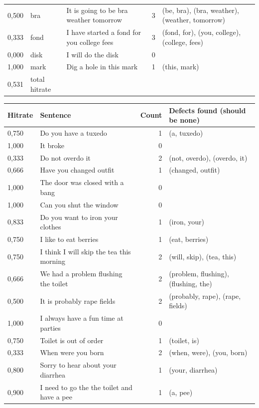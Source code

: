 \documentclass[a4paper,12pt]{article}
\begin{document}
\begin{landscape}
\begin{longtable}{l l l r l}
0,500 & bra & It is going to be bra weather tomorrow & 3 & (be, bra), (bra, weather), (weather, tomorrow) \\
0,333 & fond & I have started a fond for you college fees & 3 & (fond, for), (you, college), (college, fees) \\
0,000 & disk & I will do the disk & 0 &  \\
1,000 & mark & Dig a hole in this mark & 1 & (this, mark) \\
\hline
0,531 & total hitrate
\label{tab:resultincorrect}
\end{longtable}
\end{landscape}

\begin{landscape}
\centering
\begin{longtable}{l l r l}
Hitrate & Sentence & Count & Defects found (should be none) \\
\hline
0,750 & Do you have a tuxedo & 1 & (a, tuxedo) \\
1,000 & It broke & 0 &  \\
0,333 & Do not overdo it & 2 & (not, overdo), (overdo, it) \\
0,666 & Have you changed outfit & 1 & (changed, outfit) \\
1,000 & The door was closed with a bang & 0 &  \\
1,000 & Can you shut the window & 0 &  \\
0,833 & Do you want to iron your clothes & 1 & (iron, your) \\
0,750 & I like to eat berries & 1 & (eat, berries) \\
0,750 & I think I will skip the tea this morning & 2 & (will, skip), (tea, this) \\
0,666 & We had a problem flushing the toilet & 2 & (problem, flushing), (flushing, the) \\
0,500 & It is probably rape fields & 2 & (probably, rape), (rape, fields) \\
1,000 & I always have a fun time at parties & 0 &  \\
0,750 & Toilet is out of order & 1 & (toilet, is) \\
0,333 & When were you born & 2 & (when, were), (you, born) \\
0,800 & Sorry to hear about your diarrhea & 1 & (your, diarrhea) \\
0,900 & I need to go the the toilet and have a pee & 1 & (a, pee) \\

\end{longtable}
\end{landscape}
\end{document}
